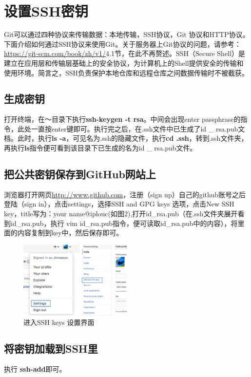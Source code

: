 \documentclass{article}
\begin{document}
\newpage
\section{设置SSH密钥}
Git可以通过四种协议来传输数据：本地传输，SSH协议，Git 协议和HTTP协议。下面介绍如何通过SSH协议来使用Git。关于服务器上Git协议的问题，请参考：\url{https://git-scm.com/book/zh/v1/}4.1节，在此不再赘述。SSH（Secure Shell）是建立在应用层和传输层基础上的安全协议，为计算机上的Shell提供安全的传输和使用环境。简言之，SSH负责保护本地仓库和远程仓库之间数据传输时不被截获。

\subsection{生成密钥}
打开终端，在～目录下执行\textbf{ssh-keygen -t rsa}。中间会出现enter passphrase的指令，此处一直按enter键即可。执行完之后，在.ssh文件中已生成了id \_ rsa.pub文档。此时，执行\textbf{ls -a}，可见名为.ssh的隐藏文件，执行\textbf{cd .ssh}，转到.ssh文件夹，再执行\textbf{ls}指令便可看到该目录下已生成的名为id \_ rsa.pub文件。

\subsection{把公共密钥保存到GitHub网站上}
浏览器打开网页\url{http://www.github.com}，注册（sign up）自己的github账号之后登陆（sign in），点击settings，选择SSH and GPG keys 选项，点击New SSH key，title写为：your name@iplouc(如图2),打开id\_rsa.pub（在.ssh文件夹展开看到id\_rsa.pub，执行 vim id\_rsa.pub指令，便可读取id\_rsa.pub中的内容），将里面的内容复制到key中，然后保存即可。

\begin{figure}[!htb] %
\centering \includegraphics[width=0.5\textwidth]{fig2.png} \caption{进入SSH keys 设置界面}
\label{fig:1}
\end{figure}

\subsection{将密钥加载到SSH里}
执行 \textbf{ssh-add}即可。
\end{document}
